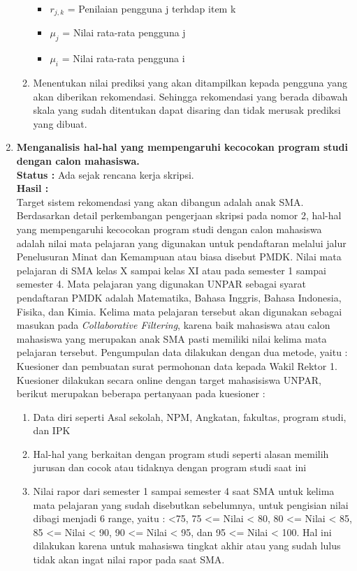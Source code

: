 \documentclass[a4paper,twoside]{article}
\begin{document}
\begin{enumerate}
\begin{enumerate}
\begin{itemize}
		\item $r_{j,k}$ = Penilaian pengguna j terhdap item k
		
		\item $\mu_{j}$ = Nilai rata-rata pengguna j
		
		\item $\mu_{i}$ = Nilai rata-rata pengguna i
	\end{itemize}
	
	\item Menentukan nilai prediksi yang akan ditampilkan kepada pengguna yang akan diberikan rekomendasi. Sehingga rekomendasi yang berada dibawah skala yang sudah ditentukan dapat disaring dan tidak merusak prediksi yang dibuat. %
	 
\end{enumerate}
	
		\item \textbf{Menganalisis hal-hal yang mempengaruhi kecocokan program studi dengan calon mahasiswa.}\\
		{\bf Status :} Ada sejak rencana kerja skripsi.\\
		{\bf Hasil :} \\
			Target sistem rekomendasi yang akan dibangun adalah anak SMA. Berdasarkan detail perkembangan pengerjaan skripsi pada nomor 2, hal-hal yang mempengaruhi kecocokan program studi dengan calon mahasiswa adalah nilai mata pelajaran yang digunakan untuk pendaftaran melalui jalur Penelusuran Minat dan Kemampuan atau biasa disebut PMDK. Nilai mata pelajaran di SMA kelas X sampai kelas XI atau pada semester 1 sampai semester 4. Mata pelajaran yang digunakan UNPAR sebagai syarat pendaftaran PMDK adalah Matematika, Bahasa Inggris, Bahasa Indonesia, Fisika, dan Kimia.  
			Kelima mata pelajaran tersebut akan digunakan sebagai masukan pada \textit{Collaborative Filtering}, karena baik mahasiswa atau calon mahasiswa yang merupakan anak SMA pasti memiliki nilai kelima mata pelajaran tersebut. Pengumpulan data dilakukan dengan dua metode, yaitu : Kuesioner dan pembuatan surat permohonan data kepada Wakil Rektor 1. Kuesioner dilakukan secara online dengan target mahasisiswa UNPAR, berikut merupakan beberapa pertanyaan pada kuesioner :
			\begin{enumerate}
				\item Data diri seperti Asal sekolah, NPM, Angkatan, fakultas, program studi, dan IPK
				\item Hal-hal yang berkaitan dengan program studi seperti alasan memilih jurusan dan cocok atau tidaknya dengan program studi saat ini
				\item Nilai rapor dari semester 1 sampai semester 4 saat SMA untuk kelima mata pelajaran yang sudah disebutkan sebelumnya, untuk pengisian nilai dibagi menjadi 6 range, yaitu : <75, 75 <= Nilai < 80, 80 <= Nilai < 85, 85 <= Nilai < 90, 90 <= Nilai < 95, dan 95 <= Nilai < 100. Hal ini dilakukan karena untuk mahasiswa tingkat akhir atau yang sudah lulus tidak akan ingat nilai rapor pada saat SMA.
			\end{enumerate}
			

\end{enumerate}
\end{document}
